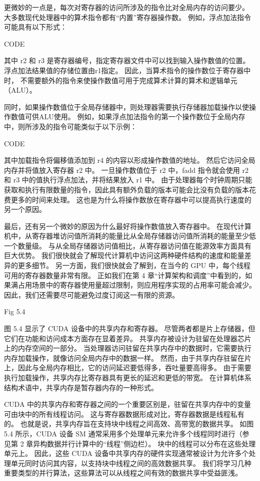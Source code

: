 更微妙的一点是，每次对寄存器的访问所涉及的指令比对全局内存的访问要少。 
大多数现代处理器中的算术指令都有“内置”寄存器操作数。 例如，浮点加法指令可能具有以下形式：

{\color{red} CODE}

其中 r2 和 r3 是寄存器编号，指定寄存器文件中可以找到输入操作数值的位置。 
浮点加法结果值的存储位置由r1指定。 因此，当算术指令的操作数位于寄存器中时，
不需要额外的指令来使操作数值可用于完成算术计算的算术和逻辑单元（ALU）。

同时，如果操作数值位于全局存储器中，则处理器需要执行存储器加载操作以使操作数值可供ALU使用。 
例如，如果浮点加法指令的第一个操作数位于全局内存中，则所涉及的指令可能类似于以下示例：

{\color{red} CODE}

其中加载指令将偏移值添加到 r4 的内容以形成操作数值的地址。 然后它访问全局内存并将值放入寄存器 r2 中。 
一旦操作数值位于 r2 中，fadd 指令就会使用 r2 和 r3 中的值执行浮点加法，并将结果放入 r1 中。 
由于处理器每个时钟周期只能获取和执行有限数量的指令，因此具有额外负载的版本可能会比没有负载的版本花费更多的时间来处理。 
这也是为什么将操作数放在寄存器中可以提高执行速度的另一个原因。

最后，还有另一个微妙的原因为什么最好将操作数值放入寄存器中。 
在现代计算机中，从寄存器堆访问值所消耗的能量比从全局存储器访问值所消耗的能量至少低一个数量级。 
与从全局存储器访问值相比，从寄存器访问值在能源效率方面具有巨大优势。 
我们很快就会了解现代计算机中访问这两种硬件结构的速度和能量差异的更多细节。 
另一方面，我们很快就会了解到，在当今的 GPU 中，每个线程可用的寄存器数量非常有限。 
正如我们在第 4 章“计算架构和调度”中看到的，如果满占用场景中的寄存器使用量超过限制，则应用程序实现的占用率可能会减少。 
因此，我们还需要尽可能避免过度订阅这一有限的资源。

{\color{red} Fig 5.4}

图 5.4 显示了 CUDA 设备中的共享内存和寄存器。 尽管两者都是片上存储器，但它们在功能和访问成本方面存在显着差异。 
共享内存被设计为驻留在处理器芯片上的内存空间的一部分。 
当处理器访问驻留在共享内存中的数据时，它需要执行内存加载操作，就像访问全局内存中的数据一样。 
然而，由于共享内存驻留在片上，因此与全局内存相比，它的访问延迟要低得多，吞吐量要高得多。 
由于需要执行加载操作，共享内存比寄存器具有更长的延迟和更低的带宽。 
在计算机体系结构术语中，共享内存是暂存器内存的一种形式。

CUDA 中的共享内存和寄存器之间的一个重要区别是，驻留在共享内存中的变量可由块中的所有线程访问。 
这与寄存器数据形成对比，寄存器数据是线程私有的。 也就是说，共享内存旨在支持块中线程之间高效、高带宽的数据共享。 
如图 5.4 所示，CUDA 设备 SM 通常采用多个处理单元来允许多个线程同时进行（参见第 2 章异构数据并行计算中的“线程”侧边栏）。 
块中的线程可以分布在这些处理单元上。 
因此，这些 CUDA 设备中共享内存的硬件实现通常被设计为允许多个处理单元同时访问其内容，以支持块中线程之间的高效数据共享。 
我们将学习几种重要类型的并行算法，这些算法可以从线程之间有效的数据共享中受益匪浅。

